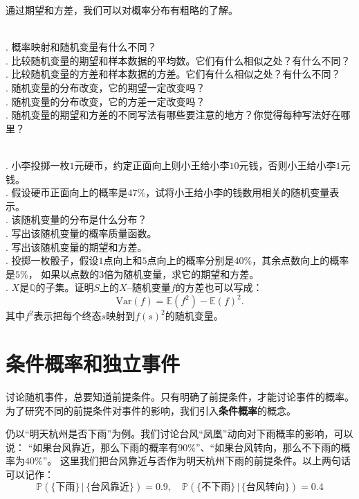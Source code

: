 \documentclass[12pt,UTF8]{ctexbook}
\begin{document}
通过期望和方差，我们可以对概率分布有粗略的了解。

\begin{sk}
    \mbox{} \\
    . 概率映射和随机变量有什么不同？ \\
    . 比较随机变量的期望和样本数据的平均数。它们有什么相似之处？有什么不同？\\
    . 比较随机变量的方差和样本数据的方差。它们有什么相似之处？有什么不同？\\
    . 随机变量的分布改变，它的期望一定改变吗？\\
    . 随机变量的分布改变，它的方差一定改变吗？ \\
    . 随机变量的期望和方差的不同写法有哪些要注意的地方？你觉得每种写法好在哪里？   
\end{sk}

\begin{xt}
    \mbox{} \\
    . 小李投掷一枚$1$元硬币，约定正面向上则小王给小李$10$元钱，否则小王给小李$1$元钱。\\
    . 假设硬币正面向上的概率是$47\%$，试将小王给小李的钱数用相关的随机变量表示。\\
    . 该随机变量的分布是什么分布？    \\
    . 写出该随机变量的概率质量函数。\\
    . 写出该随机变量的期望和方差。\\
    . 投掷一枚骰子，假设$1$点向上和$5$点向上的概率分别是$40\%$，其余点数向上的概率是$5\%$，
    如果以点数的$3$倍为随机变量，求它的期望和方差。\\
    . $X$是$\mathbb{Q}$的子集。证明$S$上的$X$–随机变量$f$的方差也可以写成：
    $$ \mathrm{Var}(f)  = \mathbb{E}(f^2) - \mathbb{E}(f)^2.$$  
    \indent \hspace{1em}  其中$f^2$表示把每个终态$s$映射到$f(s)^2$的随机变量。
\end{xt}

\section{条件概率和独立事件}
讨论随机事件，总要知道前提条件。只有明确了前提条件，才能讨论事件的概率。
为了研究不同的前提条件对事件的影响，我们引入\textbf{条件概率}的概念。

仍以“明天杭州是否下雨”为例。我们讨论台风“凤凰”动向对下雨概率的影响，可以说：
“如果台风靠近，那么下雨的概率有$90\%$”、“如果台风转向，那么不下雨的概率为$40\%$”。
这里我们把台风靠近与否作为明天杭州下雨的前提条件。以上两句话可以记作：
$$ \mathbb{P} (\{\mbox{下雨}\} \, | \, \{\mbox{台风靠近}\}) = 0.9, \quad \mathbb{P} (\{\mbox{不下雨}\} \, | \, \{\mbox{台风转向}\}) = 0.4$$
\end{document}
